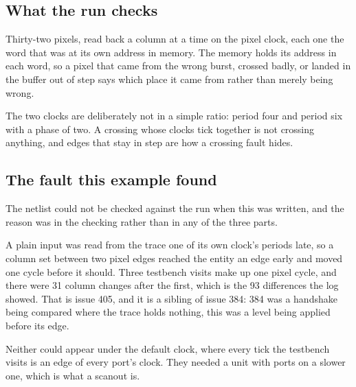 \subsection{What the run checks}

Thirty-two pixels, read back a column at a time on the pixel clock,
each one the word that was at its own address in memory. The memory
holds its address in each word, so a pixel that came from the wrong
burst, crossed badly, or landed in the buffer out of step says which
place it came from rather than merely being wrong.

The two clocks are deliberately not in a simple ratio: period four
and period six with a phase of two. A crossing whose clocks tick
together is not crossing anything, and edges that stay in step are
how a crossing fault hides.

\subsection{The fault this example found}

The netlist could not be checked against the run when this was
written, and the reason was in the checking rather than in any of the
three parts.

A plain input was read from the trace one of its own clock's periods
late, so a column set between two pixel edges reached the entity an
edge early and  moved one cycle before it should. Three
testbench visits make up one pixel cycle, and there were 31 column
changes after the first, which is the 93 differences the log
showed. That is issue 405, and it is a sibling of issue 384: 384 was
a handshake being compared where the trace holds nothing, this was a
level being applied before its edge.

Neither could appear under the default clock, where every tick the
testbench visits is an edge of every port's clock. They needed a unit
with ports on a slower one, which is what a scanout is.
